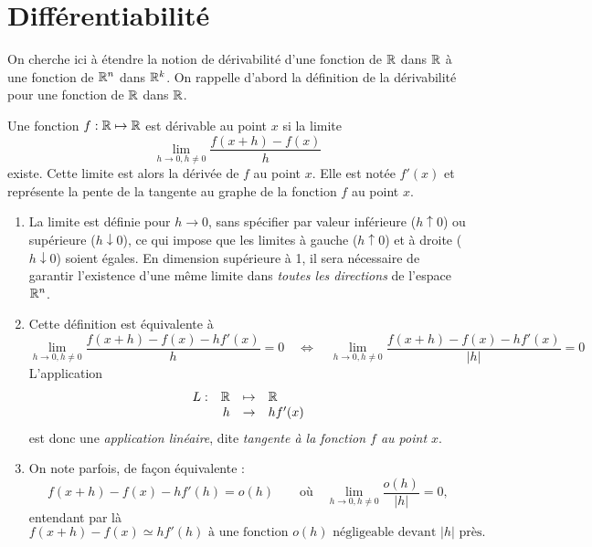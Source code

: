 \section{Différentiabilité} \label{sec:Multivar-Diff}


On cherche ici à étendre la notion de dérivabilité d'une fonction de $\mathbb{R}$ dans $\mathbb{R}$ à une fonction de $\mathbb{R}^n$ dans $\mathbb{R}^k$. On rappelle d'abord la définition de la dérivabilité pour une fonction de $\mathbb{R}$ dans $\mathbb{R}$.

\begin{definition}[Dérivabilité] \label{def:derivabilite}
  Une fonction $f: \mathbb{R} \mapsto \mathbb{R}$ est dérivable au point $x$ si la limite
  $$
  \lim_{h \to 0, h \neq 0} \frac{f(x+h) - f(x)}{h}
  $$
  existe. Cette limite est alors la dérivée de $f$ au point $x$. Elle est notée $f'(x)$ et représente la pente de la tangente au graphe de la fonction $f$ au point $x$.
\end{definition}

\remarks
\begin{enumerate}
  \item La limite est définie pour $h \to 0$, sans spécifier par valeur inférieure ($h \uparrow 0$) ou supérieure ($h \downarrow 0$), ce qui impose que les limites à gauche ($h \uparrow 0$) et à droite ($h \downarrow 0$) soient égales. En dimension supérieure à 1, il sera nécessaire de garantir l'existence d'une même limite dans {\em toutes les directions} de l'espace $\mathbb{R}^n$.
  \item Cette définition est équivalente à
  $$
  \lim_{h\to 0, h \neq 0} \frac{f(x+h) - f(x) - hf'(x)}{h} = 0
  \quad \Leftrightarrow \quad 
  \lim_{h\to 0, h \neq 0} \frac{f(x+h) - f(x) - hf'(x)}{|h|} = 0
  $$
  L'application 
  $$
  \begin{array}{rrcl}
    L :  & \mathbb{R} & \mapsto & \mathbb{R} \\
    & h & \to &  hf'(x)
  \end{array}
  $$
  est donc une {\em application linéaire}, dite {\em tangente à la fonction $f$ au point $x$}.
  \item On note parfois, de façon équivalente :
  $$
  f(x+h) - f(x) - h f'(h) = o(h)
  \qquad \text{où} \quad
  \lim_{h\to 0, h \neq 0} \frac{o(h)}{|h|} = 0,
  $$
  entendant par là 
  $$
  \text{$f(x+h) - f(x) \simeq h f'(h)$ à une fonction $o(h)$ négligeable devant $|h|$ près.}
  $$
\end{enumerate}

